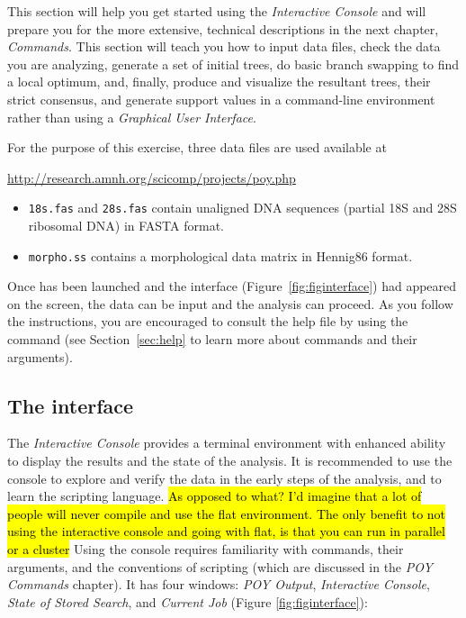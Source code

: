 {This section will help you get started using the \poy \emph{Interactive Console} and will prepare you for the
more extensive, technical descriptions in the next chapter, \emph{\poy Commands}. %
This section will teach you how to input data files, check the data you are analyzing, generate a set of initial trees, do basic branch swapping to find a local optimum, and, finally, produce and visualize the resultant trees, their strict consensus, and generate support values in a command-line environment rather than using a \emph{Graphical User Interface}. 

For the purpose of this exercise, three data files are used available at \\
\begin{center}
\url{http://research.amnh.org/scicomp/projects/poy.php}
\end{center}

\begin{itemize}
	\item {\texttt{18s.fas} and \texttt{28s.fas} contain unaligned DNA sequences (partial 18S and 28S ribosomal DNA) in FASTA format.~\cite{pearson1988}}
	\item {\texttt{morpho.ss} contains a morphological data matrix in Hennig86 format.~\cite{farris1988}}
\end{itemize}

Once \poy has been launched and the interface (Figure~\ref{fig:figinterface}) had appeared on the screen, the data can be input and the analysis can proceed. As you follow the instructions, you are encouraged to consult the help file by using the command  (see Section~\ref{sec:help} to learn more about \poy commands and their arguments).

\subsection{The interface}

The \emph{Interactive Console} provides a terminal environment with enhanced ability to display the results and the state of the analysis. It is recommended to use the console to explore and verify the data in the early steps of the analysis, and to learn the scripting language. \hl{As opposed to what? I'd imagine that a lot of people will never compile and use the flat environment. The only benefit to not using the interactive console and going with flat, is that you can run in parallel or a cluster} Using the console requires familiarity with \poy commands, their arguments, and the conventions of \poy scripting (which are discussed in the \emph{POY Commands} chapter). It has four windows: \emph{POY Output}, \emph{Interactive Console}, \emph{State of Stored Search}, and \emph{Current Job} (Figure \ref{fig:figinterface}):

}
